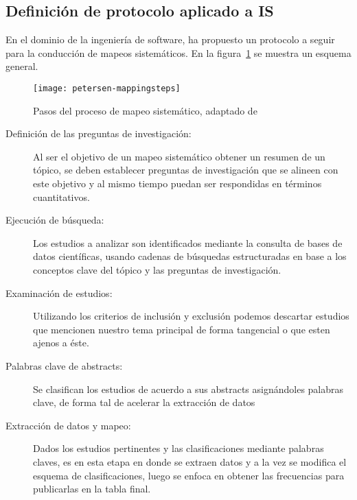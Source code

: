 \subsection{Definición de protocolo aplicado a IS}

En el dominio de la ingeniería de software, \cite{Petersen2007} ha propuesto un protocolo
a seguir para la conducción de mapeos sistemáticos. En la figura~\ref{fig:pasos-ms} se muestra un esquema
general.

\begin{figure}[h!]
	\centering
	\texttt{[image: petersen-mappingsteps]}
	\caption[Pasos del proceso de mapeo sistemático]{Pasos del proceso de mapeo sistemático, adaptado de \cite{Petersen2007}}
	\label{fig:pasos-ms}
\end{figure}


\begin{description}
\item[Definición de las preguntas de investigación:] Al ser el objetivo de un mapeo sistemático
	obtener un resumen de un tópico, se deben establecer  preguntas de investigación que 
	se alineen con este objetivo y al mismo tiempo puedan ser respondidas en términos 
	cuantitativos. 

\item[Ejecución de búsqueda:] Los estudios a analizar son identificados mediante la 
consulta de bases de datos científicas, usando cadenas de búsquedas estructuradas
en base a los conceptos clave del tópico y las preguntas de investigación.

\item[Examinación de estudios:] Utilizando los criterios de inclusión y exclusión 
podemos descartar estudios que mencionen nuestro tema principal de forma 
tangencial o que esten ajenos a éste.

\item[Palabras clave de abstracts:] Se clasifican los estudios de acuerdo a sus abstracts
asignándoles palabras clave, de forma tal de acelerar la extracción de datos 

\item[Extracción de datos y mapeo:] Dados los estudios pertinentes y las clasificaciones
mediante palabras claves, es en esta etapa en donde se extraen datos y a la vez se 
modifica el esquema de clasificaciones, luego se enfoca en obtener las frecuencias
para publicarlas en la tabla final.

\end{description}

